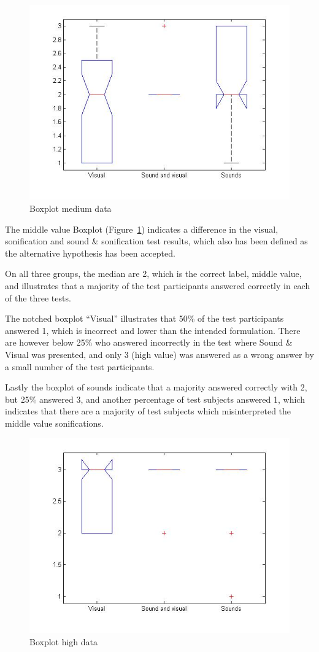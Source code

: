 \begin{figure}[!htbp]
    \centering
    \includegraphics[width=.7\textwidth]{images/Evaluation7.jpg}
    \caption{Boxplot medium data}
    \label{fig:evaluation7}
\end{figure}

The middle value Boxplot (Figure~\ref{fig:evaluation7}) indicates a difference in the visual, sonification and sound \& sonification test results, which also has been defined as the alternative hypothesis has been accepted.

On all three groups, the median are 2, which is the correct label, middle value, and illustrates that a majority of the test participants answered correctly in each of the three tests.

The notched boxplot “Visual” illustrates that 50\% of the test participants answered 1, which is incorrect and lower than the intended formulation. There are however below 25\% who answered incorrectly in the test where Sound \& Visual was presented, and only 3 (high value) was answered as a wrong answer by a small number of the test participants.

Lastly the boxplot of sounds indicate that a majority answered correctly with 2, but 25\% answered 3, and another percentage of test subjects answered 1, which indicates that there are a majority of test subjects which misinterpreted the middle value sonifications. 

\begin{figure}[!htbp]
    \centering
    \includegraphics[width=.7\textwidth]{images/Evaluation8.jpg}
    \caption{Boxplot high data}
    \label{fig:evaluation8}
\end{figure}

